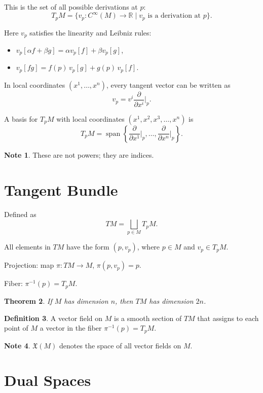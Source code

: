 \documentclass[11pt]{report}
\theoremstyle{definition}
\newtheorem{definition}{Definition}[chapter]
\newtheorem{note}[definition]{Note}
\theoremstyle{plain}
\newtheorem{theorem}[definition]{Theorem}
\theoremstyle{remark}
\newcommand{\R}{\mathbb{R}}
\newcommand{\Span}{\operatorname{span}}
\begin{document}
This is the set of all possible derivations at $p$:
\[
T_pM=\{v_p:C^\infty(M)\to \R\mid v_p \text{ is a derivation at } p\}.
\]

Here $v_p$ satisfies the linearity and Leibniz rules:
\begin{itemize}
    \item $v_p[\alpha f+\beta g]=\alpha v_p[f]+\beta v_p[g]$,
    \item $v_p[fg]=f(p)\,v_p[g]+g(p)\,v_p[f]$.
\end{itemize}

In local coordinates $(x^1,\dots,x^n)$, every tangent vector can be written as
\[
v_p=v^i\frac{\partial}{\partial x^i}\Big|_p.
\]

A basis for $T_pM$ with local coordinates $(x^1,x^2,x^3,\dots,x^n)$ is
\[
T_pM=\Span\left\{\frac{\partial}{\partial x^1}\Big|_p,\dots,\frac{\partial}{\partial x^n}\Big|_p\right\}.
\]

\begin{note}
These are not powers; they are indices.
\end{note}

\section{Tangent Bundle}

Defined as
\[
TM=\bigsqcup_{p\in M} T_pM.
\]

All elements in $TM$ have the form $(p,v_p)$, where $p\in M$ and $v_p\in T_pM$.

Projection: map $\pi:TM\to M$, $\pi(p,v_p)=p$.

Fiber: $\pi^{-1}(p)=T_pM$.

\begin{theorem}
If $M$ has dimension $n$, then $TM$ has dimension $2n$.
\end{theorem}

\begin{definition}
A vector field on $M$ is a smooth section of $TM$ that assigns to each point of $M$ a vector in the fiber $\pi^{-1}(p)=T_pM$.
\end{definition}

\begin{note}
$\mathfrak X(M)$ denotes the space of all vector fields on $M$.
\end{note}

\section{Dual Spaces}
\end{document}
